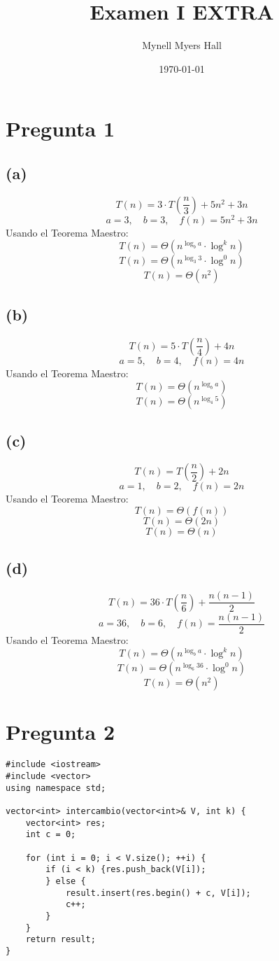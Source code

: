\documentclass{article}
\title{Examen I EXTRA}
\author{Mynell Myers Hall}
\date{\today}
\begin{document}
\maketitle

\section*{Pregunta 1}

\subsection*{(a)}
\[
T(n) = 3 \cdot T\left(\frac{n}{3}\right) + 5n^2 + 3n
\]
\[
a = 3, \quad b = 3, \quad f(n) = 5n^2 + 3n
\]
Usando el Teorema Maestro:
\[
T(n) = \Theta(n^{\log_b a} \cdot \log^k n)
\]
\[
T(n) = \Theta(n^{\log_3 3} \cdot \log^0 n)
\]
\[
T(n) = \Theta(n^2)
\]

\subsection*{(b)}
\[
T(n) = 5 \cdot T\left(\frac{n}{4}\right) + 4n
\]
\[
a = 5, \quad b = 4, \quad f(n) = 4n
\]
Usando el Teorema Maestro:
\[
T(n) = \Theta(n^{\log_b a})
\]
\[
T(n) = \Theta(n^{\log_4 5})
\]

\subsection*{(c)}
\[
T(n) = T\left(\frac{n}{2}\right) + 2n
\]
\[
a = 1, \quad b = 2, \quad f(n) = 2n
\]
Usando el Teorema Maestro:
\[
T(n) = \Theta(f(n))
\]
\[
T(n) = \Theta(2n)
\]
\[
T(n) = \Theta(n)
\]

\subsection*{(d)}
\[
T(n) = 36 \cdot T\left(\frac{n}{6}\right) + \frac{n(n-1)}{2}
\]
\[
a = 36, \quad b = 6, \quad f(n) = \frac{n(n-1)}{2}
\]
Usando el Teorema Maestro:
\[
T(n) = \Theta(n^{\log_b a} \cdot \log^k n)
\]
\[
T(n) = \Theta(n^{\log_6 36} \cdot \log^0 n)
\]
\[
T(n) = \Theta(n^2)
\]

\section*{Pregunta 2}
\begin{lstlisting}[style=customcpp]
#include <iostream>
#include <vector>
using namespace std;

vector<int> intercambio(vector<int>& V, int k) {
    vector<int> res;
    int c = 0;

    for (int i = 0; i < V.size(); ++i) {
        if (i < k) {res.push_back(V[i]);
        } else {
            result.insert(res.begin() + c, V[i]);
            c++;
        }
    }
    return result;
}
\end{lstlisting}
\end{document}
